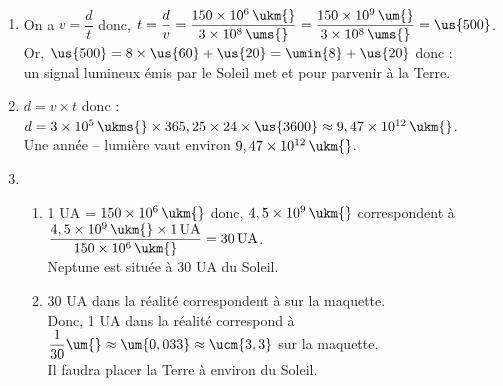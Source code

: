 \ \\ [-5.5mm]
   \begin{enumerate}
      \item On a $v =\dfrac{d}{t}$ donc, $t =\dfrac{d}{v} =\dfrac{150\times10^6\,\ukm{}}{3\times10^8\,\ums{}} =\dfrac{150\times10^9\,\um{}}{3\times10^8\,\ums{}} =\us{500}$. \\ [1mm]
         Or, $\us{500} =8\times\us{60}+\us{20} =\umin{8}+\us{20}$ donc : \\
         {\blue un signal lumineux émis par le Soleil met  et  pour parvenir à la Terre}.
      \item $d =v\times t$ donc : $d =3\times10^5\,\ukms{}\times365,25\times24\times\us{3600} \approx9,47\times10^{12}\,\ukm{}$. \\
         {\blue Une année -- lumière vaut environ $9,47\times10^{12}\,\ukm{}$.}
      \item
         \begin{enumerate}
            \item 1 UA = $150\times10^6\,\ukm{}$ donc, $4,5\times10^9\,\ukm{}$ correspondent à $\dfrac{4,5\times10^9\,\ukm{}\times1\,\text{UA}}{150\times10^6\,\ukm{}} =30\,\text{UA}$. \\ [1mm]
               {\blue Neptune est située à 30 UA du Soleil.}
            \item 30 UA dans la réalité correspondent à  sur la maquette. \\
               Donc, 1 UA dans la réalité correspond à $\dfrac{1}{30}\um{} \approx\um{0,033} \approx\ucm{3,3}$ sur la maquette. \\ [1mm]
               {\blue Il faudra placer la Terre à environ  du Soleil.}
         \end{enumerate}
   \end{enumerate}
